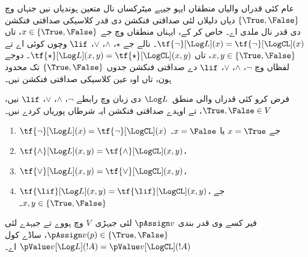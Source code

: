\documentclass[../../../include/open-logic-section]{subfiles}
\begin{document}


عام کئی قدراں والیاں منطقاں ایہو جیہے میٹرکساں نال متعین
ہوندیاں نیں جنہاں وچ $\{\True, \False\}$ دیاں دلیلاں لئی
صداقتی فنکشن دی قدر کلاسیکی صداقتی فنکشن دی قدر نال ملدی اے۔
خاص کر کے، ایہناں منطقاں وچ جے $x \in \{\True, \False\}$،
تاں $\tf{\lnot}[\Log L](x) =
\tf{\lnot}[\LogCL](x)$۔ نالے جے $\star$، $\land$، $\lor$،
$\lif$ وچوں کوئی اے تے $x, y \in \{\True, \False\}$،
تاں $\tf{\star}[\Log L](x,y) =
\tf{\star}[\LogCL](x,y)$۔ دوجے لفظاں وچ $\lnot$، $\land$،
$\lor$، $\lif$ دے صداقتی فنکشن جدوں $\{\True,\False\}$ تک
محدود ہون، تاں اوہ عین کلاسیکی صداقتی فنکشن نیں۔

\begin{prop}
  فرض کرو کئی قدراں والی منطق~$\Log L$ دی زبان وچ رابطے
  $\lnot$، $\land$، $\lor$، $\lif$ نیں، $\True, \False \in
  V$، تے اوہدے صداقتی فنکشن ایہ شرطاں پوریاں کردے نیں۔
  \begin{enumerate}
    \item{} $\tf{\lnot}[\Log L](x) = \tf{\lnot}[\LogCL](x)$ جے $x =
    \True$ یا $x = \False$۔
    \item{} $\tf{\land}[\Log L](x,y) = \tf{\land}[\LogCL](x,y)$،
    \item{} $\tf{\lor}[\Log L](x,y) = \tf{\lor}[\LogCL](x,y)$،
    \item{} $\tf{\lif}[\Log L](x,y) = \tf{\lif}[\LogCL](x,y)$،
    جے $x, y \in \{\True, \False\}$۔
  \end{enumerate}
  فیر کسے وی قدر بندی $\pAssign v$ لئی جیہڑی~$V$ وچ ہووے
  تے جیہدے لئی $\pAssign
  v(p) \in \{\True,\False\}$، ساڈے کول $\pValue v[\Log L](!A) = \pValue
  v[\LogCL](!A)$ اے۔
\end{prop}
\end{document}
